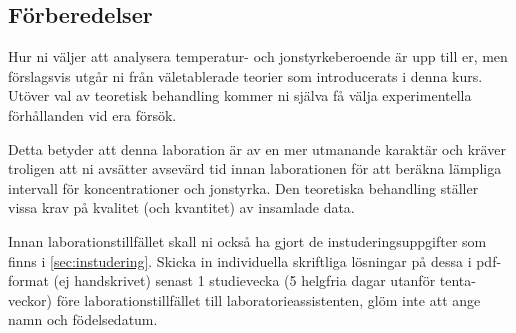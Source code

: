 \subsection{Förberedelser}
Hur ni väljer att analysera temperatur- och jonstyrkeberoende är
upp till er, men förslagsvis utgår ni från väletablerade
teorier som introducerats i denna kurs. Utöver val av teoretisk behandling
kommer ni själva få välja experimentella förhållanden vid era försök.

Detta betyder att denna laboration är av en mer utmanande karaktär och
kräver troligen att ni avsätter avsevärd tid innan laborationen för att
beräkna lämpliga intervall för koncentrationer och jonstyrka.
Den teoretiska behandling ställer vissa krav på kvalitet (och
kvantitet) av insamlade data.

Innan laborationstillfället skall ni också ha gjort de
instuderingsuppgifter som finns i \cref{sec:instudering}. Skicka in
individuella skriftliga lösningar på dessa i pdf-format (ej handskrivet)
senast 1 studievecka (5 helgfria dagar utanför tenta-veckor) före
laborationstillfället till  laboratorieassistenten, glöm inte att ange namn
och födelsedatum.

